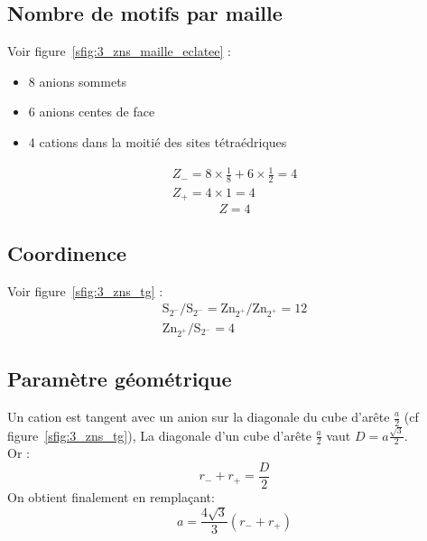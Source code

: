 \subsection{Nombre de motifs par maille}
Voir figure~\ref{sfig:3_zns_maille_eclatee} :
\begin{itemize}
    \item 8 anions sommets
    \item 6 anions centes de face
    \item 4 cations dans la moitié des sites tétraédriques
\end{itemize}
\begin{gather*}
    Z_- = 8 \times \frac{1}{8} + 6 \times \frac{1}{2} = 4\\
    Z_+ = 4 \times 1 = 4
\end{gather*}
\begin{equation}
    Z = 4
\end{equation}


\subsection{Coordinence}
Voir figure~\ref{sfig:3_zns_tg} :\\
\begin{gather}
    \text{S}_{2^-}/\text{S}_{2^-} = \text{Zn}_{2^+}/\text{Zn}_{2^+} = 12\\
    \text{Zn}_{2^+}/\text{S}_{2^-} = 4
\end{gather}


\subsection{Paramètre géométrique}
Un cation est tangent avec un anion sur la diagonale du cube d'arête $\frac{a}{2}$
(cf figure~\ref{sfig:3_zns_tg}),
La diagonale d'un cube d'arête $\frac{a}{2}$ vaut $D = a\frac{\sqrt{3}}{2}$.\\
Or :
\begin{equation}
    r_- + r_+ = \frac{D}{2}
\end{equation}
On obtient finalement en remplaçant:
\begin{equation}
    \boxed{a = \frac{4\sqrt{3}}{3}(r_- + r_+)}
    \label{eq:3_zns_ar+r-}
\end{equation}


